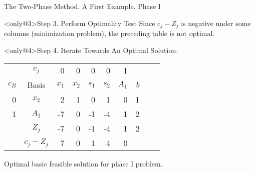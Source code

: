 \begin{frame}{The Two-Phase Method. A First Example. Phase I}
\begin{block}
\end{block}

\begin{block}<only@3>{Step 3. Perform Optimality Test} \justifying
  Since $c_j - Z_j$ is negative under some columns (minimization problem), the preceding table is not optimal.
\end{block}

\begin{block}<only@4>{Step 4. Iterate Towards An Optimal Solution.} \justifying
    {\centering
      \begin{tabular}{rcrrrrrrrl}
        \toprule
        &$c_j$&0&0&0&0&1&&&\\
        $c_B$&Basis&$x_1$&$x_2$&$s_1$&$s_2$&$A_1$&$b$&&\\
        \midrule
        0&$x_2$&2&1&0&1&0&1&&\\
        
        1&\cellcolor{yellow}$A_1$&-7&0&-1&-4&1&\cellcolor{yellow}2&&\\
        \midrule
        &$Z_j$&-7&0&-1&-4&1&\cellcolor{red!30}2&&\\
        &$c_j -Z_j$&\cellcolor{blue!30}7&\cellcolor{blue!30}0&\cellcolor{blue!30}1&\cellcolor{blue!30}4&\cellcolor{blue!30}0&&&\\
        \toprule
      \end{tabular}
      \par}
    Optimal basic feasible solution for phase I problem. 
  \end{block}

\end{frame}



